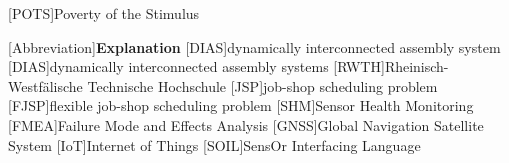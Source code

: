 \usepackage{acronym}[POTS]{Poverty of the Stimulus}


\begin{acronym}[Abbreviation]
    [Abbreviation]{\textbf{Explanation}}
    [DIAS]{dynamically interconnected assembly system}
    [DIAS]{dynamically interconnected assembly systems}
    [RWTH]{Rheinisch-Westfälische Technische Hochschule}
    [JSP]{job-shop scheduling problem}
    [FJSP]{flexible job-shop scheduling problem}
    [SHM]{Sensor Health Monitoring}
    [FMEA]{Failure Mode and Effects Analysis}
    [GNSS]{Global Navigation Satellite System}
    [IoT]{Internet of Things}
    [SOIL]{SensOr Interfacing Language}
\end{acronym}
